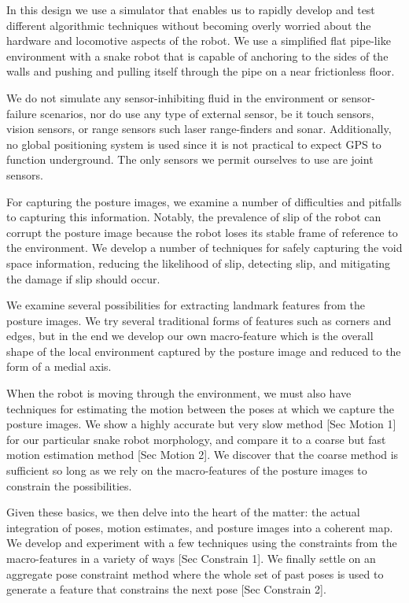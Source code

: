 In this design we use a simulator that enables us to rapidly develop and test different algorithmic techniques without becoming overly worried about the hardware and locomotive aspects of the robot. We use a simplified flat pipe-like environment with a snake robot that is capable of anchoring to the sides of the walls and pushing and pulling itself through the pipe on a near frictionless floor. 

We do not simulate any sensor-inhibiting fluid in the environment or sensor-failure scenarios, nor do use any type of external sensor, be it touch sensors, vision sensors, or range sensors such laser range-finders and sonar. Additionally, no global positioning system is used since it is not practical to expect GPS to function underground. The only sensors we permit ourselves to use are joint sensors.

For capturing the posture images, we examine a number of difficulties and pitfalls to capturing this information. Notably, the prevalence of slip of the robot can corrupt the posture image because the robot loses its stable frame of reference to the environment. We develop a number of techniques for safely capturing the void space information, reducing the likelihood of slip, detecting slip, and mitigating the damage if slip should occur.

We examine several possibilities for extracting landmark features from the posture images. We try several traditional forms of features such as corners and edges, but in the end we develop our own macro-feature which is the overall shape of the local environment captured by the posture image and reduced to the form of a medial axis.

When the robot is moving through the environment, we must also have techniques for estimating the motion between the poses at which we capture the posture images. We show a highly accurate but very slow method [Sec Motion 1] for our particular snake robot morphology, and compare it to a coarse but fast motion estimation method [Sec Motion 2]. We discover that the coarse method is sufficient so long as we rely on the macro-features of the posture images to constrain the possibilities.

Given these basics, we then delve into the heart of the matter: the actual integration of poses, motion estimates, and posture images into a coherent map. We develop and experiment with a few techniques using the constraints from the macro-features in a variety of ways [Sec Constrain 1]. We finally settle on an aggregate pose constraint method where the whole set of past poses is used to generate a feature that constrains the next pose [Sec Constrain 2].

